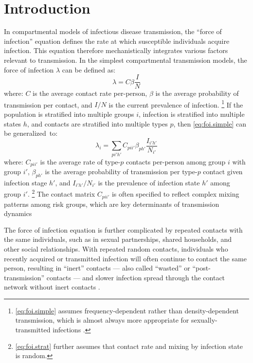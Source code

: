 \section{Introduction}\label{intro}
In compartmental models of infectious disease transmission,
the ``force of infection'' equation defines
the rate at which susceptible individuals acquire infection.
This equation therefore mechanistically integrates
various factors relevant to transmission.
In the simplest compartmental transmission models,
the force of infection $\lambda$ can be defined as:
\begin{equation}\label{eq:foi.simple}
  \lambda = C \beta \frac{I}{N}
\end{equation} where:
$C$ is the average contact rate per-person,
$\beta$ is the average probability of transmission per contact, and
$I/N$ is the current prevalence of infection.%
\footnote{\eqref{eq:foi.simple} assumes
  frequency-dependent rather than density-dependent transmission,
  which is almost always more appropriate for sexually-transmitted infections \cite{Begon2002}.}
If the population is stratified into multiple groups $i$,
infection is stratified into multiple states $h$, and
contacts are stratified into multiple types $p$,
then \eqref{eq:foi.simple} can be generalized~to:
\begin{equation}\label{eq:foi.strat}
  \lambda_i = \sum_{pi'h'} C_{pii'} \beta_{ph'} \frac{I_{i'h'}}{N_{i'}}
\end{equation}
where:
$C_{pii'}$ is the average rate of type-$p$ contacts per-person among group $i$ with group $i'$,
$\beta_{ph'}$ is the average probability of transmission per type-$p$ contact given infection stage $h'$, and
$I_{i'h'}/N_{i'}$ is the prevalence of infection state $h'$ among group $i'$.%
\footnote{\eqref{eq:foi.strat} further assumes that
  contact rate and mixing by infection state is random.}
The contact matrix $C_{pii'}$ is often specified to reflect
complex mixing patterns among risk groups,
which are key determinants of transmission dynamics \cite{??}
\par
The force of infection equation is further complicated by
repeated contacts with the same individuals, such as
in sexual partnerships, shared households, and other social relationships.
With repeated \vs random contacts, individuals who recently acquired or transmitted infection
will often continue to contact the same person, resulting in ``inert'' contacts
--- also called ``wasted'' or ``post-transmission'' contacts ---
and slower infection spread through the contact network \vs without inert contacts \cite{??}.
